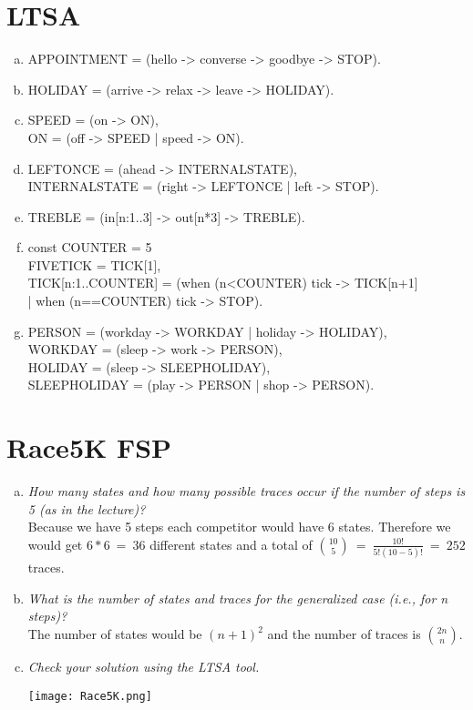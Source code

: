 \documentclass{report}
\begin{document}
	\section{LTSA}
	\startsection
		\begin{enumerate}[a)]
			\item APPOINTMENT = (hello -> converse -> goodbye -> STOP).
			\item HOLIDAY = (arrive -> relax -> leave -> HOLIDAY).
			\item SPEED = (on -> ON), \\
			ON = (off -> SPEED | speed -> ON).
			\item LEFTONCE = (ahead -> INTERNALSTATE), \\
			INTERNALSTATE = (right -> LEFTONCE | left -> STOP).
			\item TREBLE = (in[n:1..3] -> out[n*3] -> TREBLE).
			\item const COUNTER = 5 \\
			FIVETICK  = TICK[1], \\
			TICK[n:1..COUNTER] = (when (n<COUNTER) tick -> TICK[n+1] \\
			| when (n==COUNTER) tick -> STOP).
			\item PERSON = (workday -> WORKDAY | holiday -> HOLIDAY), \\
			WORKDAY = (sleep -> work -> PERSON), \\
			HOLIDAY = (sleep -> SLEEPHOLIDAY), \\
			SLEEPHOLIDAY = (play -> PERSON | shop -> PERSON).

		\end{enumerate}
	\closesection
	
	\section{Race5K FSP}
	\startsection
		\begin{enumerate}[a)]
			\item \textit{How many states and how many possible traces occur if the number of steps is 5 (as in the lecture)?} \\
			Because we have 5 steps each competitor would have 6 states. Therefore we would get $6*6 \ = \ 36$ different states and a total of $\binom{10}{5} \ = \ \frac{10!}{5!(10-5)!} \ = \ 252$ traces.
			\item \textit{What is the number of states and traces for the generalized case (i.e., for n steps)?} \\
			The number of states would be $(n+1)^2$ and the number of traces is $\binom{2n}{n}$.
			\item \textit{Check your solution using the LTSA tool.} \\
			\begin{adjustwidth}{-6em}{}
				\texttt{[image: Race5K.png]}
			\end{adjustwidth}
		\end{enumerate}
	\closesection
\end{document}
